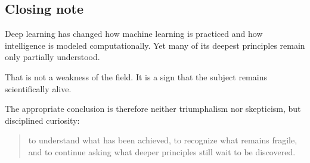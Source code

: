 \subsection*{Closing note}

Deep learning has changed how machine learning is practiced and how intelligence is modeled computationally.
Yet many of its deepest principles remain only partially understood.

\medskip

That is not a weakness of the field.
It is a sign that the subject remains scientifically alive.

\medskip

The appropriate conclusion is therefore neither triumphalism nor skepticism, but disciplined curiosity:
\begin{quote}
to understand what has been achieved, to recognize what remains fragile, and to continue asking what deeper principles still wait to be discovered.
\end{quote}